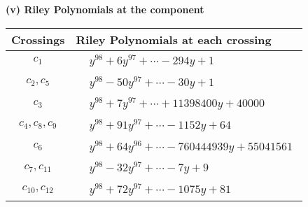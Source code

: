 \documentclass[1p]{elsarticle_modified}
\theoremstyle{definition}
\begin{document}
\newpage\renewcommand{\arraystretch}{1}
\flushleft \textbf{(v) Riley Polynomials at the component}\newline \\
\begin{tabular}{m{50pt}|m{274pt}}
Crossings & \hspace{64pt}Riley Polynomials at each crossing \\
\hline $$\begin{aligned}c_{1}\end{aligned}$$&$\begin{aligned}
&y^{98}+6 y^{97}+\cdots-294 y+1
\end{aligned}$\\
\hline $$\begin{aligned}c_{2},c_{5}\end{aligned}$$&$\begin{aligned}
&y^{98}-50 y^{97}+\cdots-30 y+1
\end{aligned}$\\
\hline $$\begin{aligned}c_{3}\end{aligned}$$&$\begin{aligned}
&y^{98}+7 y^{97}+\cdots+11398400 y+40000
\end{aligned}$\\
\hline $$\begin{aligned}c_{4},c_{8},c_{9}\end{aligned}$$&$\begin{aligned}
&y^{98}+91 y^{97}+\cdots-1152 y+64
\end{aligned}$\\
\hline $$\begin{aligned}c_{6}\end{aligned}$$&$\begin{aligned}
&y^{98}+64 y^{96}+\cdots-760444939 y+55041561
\end{aligned}$\\
\hline $$\begin{aligned}c_{7},c_{11}\end{aligned}$$&$\begin{aligned}
&y^{98}-32 y^{97}+\cdots-7 y+9
\end{aligned}$\\
\hline $$\begin{aligned}c_{10},c_{12}\end{aligned}$$&$\begin{aligned}
&y^{98}+72 y^{97}+\cdots-1075 y+81
\end{aligned}$\\
\hline
\end{tabular}\\~\\
\end{document}
